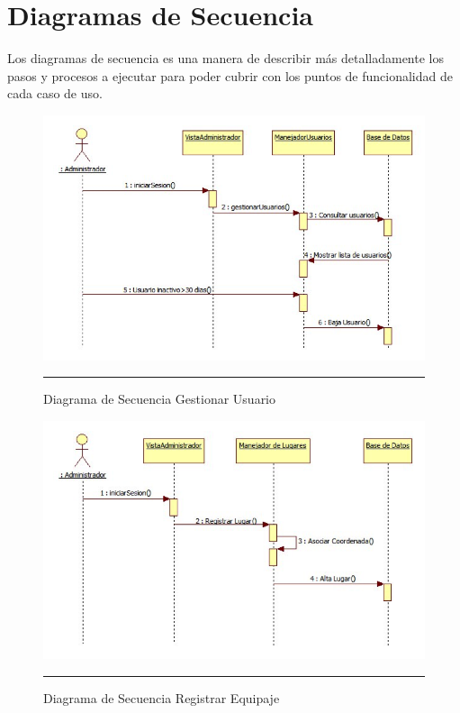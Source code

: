 \section{Diagramas de Secuencia}

Los diagramas de secuencia es una manera de describir más detalladamente los pasos y procesos a ejecutar para poder cubrir con los puntos de funcionalidad de cada caso de uso. 

\begin{figure}[h]
	\centering
		\includegraphics[width=1\textwidth]{Figuras/secGestionarUsuario.png}
		\rule{30em}{0.5pt}
	\caption[Diagrama de Secuencia Gestionar Usuario]{Diagrama de Secuencia Gestionar Usuario}
	\label{fig:secGestionarUsuario}
\end{figure}

\begin{figure}[h]
	\centering
		\includegraphics[width=1\textwidth]{Figuras/secRegistrarEquipaje.png}
		\rule{30em}{0.5pt}
	\caption[Diagrama de Secuencia Registrar Equipaje]{Diagrama de Secuencia Registrar Equipaje}
	\label{fig:secRegistrarEquipaje}
\end{figure}

